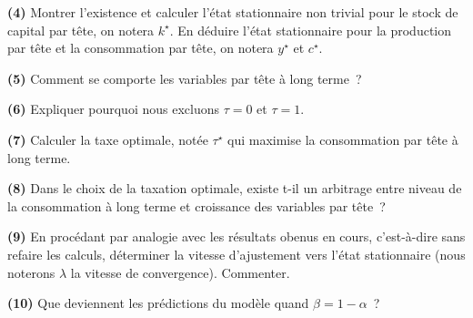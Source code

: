 \documentclass[10pt,a4paper,notitlepage,twocolumn]{article}
\newcommand{\question}[1]{\textbf{(#1)}}
\begin{document}
\question{4} Montrer l'existence et calculer l'état stationnaire non
trivial pour le stock de capital par tête, on notera $k^{\star}$. En
déduire l'état stationnaire pour la production par tête et la
consommation par tête, on notera $y^\star$ et $c^{\star}$.\newline

\question{5} Comment se comporte les variables par tête à long terme~?\newline

\question{6} Expliquer pourquoi nous excluons $\tau=0$ et $\tau=1$.\newline

\question{7} Calculer la taxe optimale, notée $\tau^{\star}$ qui
maximise la consommation par tête à long terme.\newline

\question{8} Dans le choix de la taxation optimale, existe t-il un
arbitrage entre niveau de la consommation à long terme et croissance
des variables par tête~?\newline

\question{9} En procédant par analogie avec les résultats obenus en
cours, c'est-à-dire sans refaire les calculs, déterminer la vitesse
d'ajustement vers l'état stationnaire (nous noterons $\lambda$ la
vitesse de convergence). Commenter.\newline

\question{10} Que deviennent les prédictions du modèle quand $\beta=1-\alpha$~?
\end{document}
